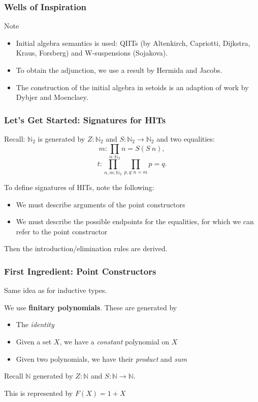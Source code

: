 \documentclass{beamer}
\begin{document}
\begin{frame}
\frametitle{Wells of Inspiration}
Note
\begin{itemize}
	\item Initial algebra semantics is used: QIITs (by Altenkirch, Capriotti, Dijkstra, Kraus, Forsberg) and W-suspensions (Sojakova).
	\item To obtain the adjunction, we use a result by Hermida and Jacobs.
	\item The construction of the initial algebra in setoids is an adaption of work by Dybjer and Moenclaey.
\end{itemize}
\end{frame}

\begin{frame}
\frametitle{Let's Get Started: Signatures for HITs}
Recall: $\mathbb{N}_2$ is generated by $Z : \mathbb{N}_2$ and $S : \mathbb{N}_2 \rightarrow \mathbb{N}_2$ and two equalities:
\[
m : \prod_{n : \mathbb{N}_2} n = S(S \> n),
\]
\[
t : \prod_{n, m : \mathbb{N}_2} \prod_{p, q : n = m} p = q.
\]

To define signatures of HITs, note the following:
\begin{itemize}
	\item We must describe arguments of the point constructors
	\item We must describe the possible endpoints for the equalities, for which we can refer to the point constructor
\end{itemize}
Then the introduction/elimination rules are derived.
\end{frame}

\begin{frame}
\frametitle{First Ingredient: Point Constructors}
Same idea as for inductive types.

We use \textbf{finitary polynomials}.
These are generated by
\begin{itemize}
	\item The \emph{identity}
	\item Given a set $X$, we have a \emph{constant} polynomial on $X$
	\item Given two polynomials, we have their \emph{product} and \emph{sum}
\end{itemize}
Recall $\mathbb{N}$ generated by $Z : \mathbb{N}$ and $S : \mathbb{N} \rightarrow \mathbb{N}$.

This is represented by $F(X) = 1 + X$
\end{frame}
\end{document}
